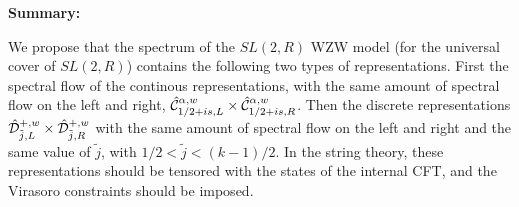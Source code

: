 \bigskip

\noindent
{\bf Summary:}
   
We propose that the spectrum of the $SL(2,R)$ WZW model 
(for the universal cover of $SL(2,R)$) contains 
the following two types of 
representations. First the spectral flow of the continous representations, 
with the same amount of spectral flow on the left and right, 
 $ \hat {\cal C}^{\alpha ,w}_{1/2 + is,L} 
\times \hat{\cal C}^{\alpha ,w}_{1/2 +is,R } $.
 Then the discrete representations
$\hat {\cal D}^{+,w}_{\tilde j,L} \times \hat {\cal D}^{+,w}_{\tilde j,R}$
with the same amount of spectral flow on the left and right and the same
value of $\tilde j$, with $ 1/2 < \tilde j < (k-1)/2 $. 
In the string theory, 
these representations should be tensored with the states of the internal
CFT, and the Virasoro constraints should be imposed. 








